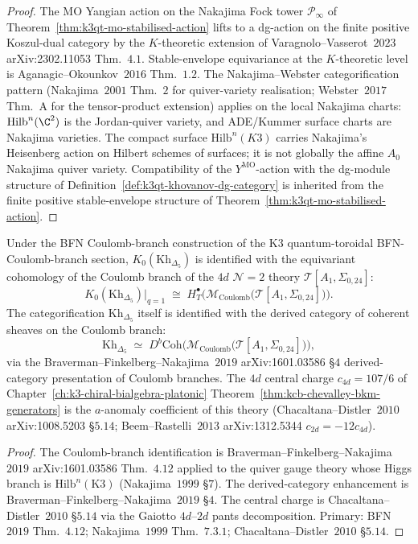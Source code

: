 \begin{proof}
The MO Yangian action on the Nakajima Fock tower $\mathcal P_\infty$
of Theorem~\ref{thm:k3qt-mo-stabilised-action} lifts to a dg-action
on the finite positive Koszul-dual category by the $K$-theoretic extension of
Varagnolo--Vasserot~$2023$ arXiv:2302.11053 Thm.\ $4.1$.
Stable-envelope equivariance at the $K$-theoretic level is
Aganagic--Okounkov~$2016$ Thm.\ $1.2$. The Nakajima--Webster
categorification pattern (Nakajima~$2001$ Thm.\ $2$ for
quiver-variety realisation; Webster~$2017$ Thm.\ A for the
tensor-product extension) applies on the local Nakajima charts:
\(\mathrm{Hilb}^n(\C^2)\) is the Jordan-quiver variety, and ADE/Kummer
surface charts are Nakajima varieties.  The compact surface
\(\mathrm{Hilb}^n(K3)\) carries Nakajima's Heisenberg action on Hilbert
schemes of surfaces; it is not globally the affine \(A_0\) Nakajima
quiver variety.
Compatibility of the $Y^{\mathrm{MO}}$-action with the dg-module
structure of Definition~\ref{def:k3qt-khovanov-dg-category} is
inherited from the finite positive stable-envelope structure of
Theorem~\ref{thm:k3qt-mo-stabilised-action}.
\end{proof}

\begin{corollary}
\label{cor:k3qt-khovanov-coulomb}
Under the BFN Coulomb-branch construction of
the K3 quantum-toroidal BFN-Coulomb-branch section, $K_0(\mathrm{Kh}_{\Delta_5})$
is identified with the equivariant cohomology of the Coulomb branch
of the $4d$ $\mathcal N = 2$ theory $\mathcal T[A_1, \Sigma_{0, 24}]$:
\[
 K_0(\mathrm{Kh}_{\Delta_5})\bigl|_{q = 1}
 \;\cong\;
 H^\bullet_T\bigl(\mathcal M_{\mathrm{Coulomb}}
 \bigl(\mathcal T[A_1, \Sigma_{0, 24}]\bigr)\bigr).
\]
The categorification $\mathrm{Kh}_{\Delta_5}$ itself is identified
with the derived category of coherent sheaves on the Coulomb branch:
\[
 \mathrm{Kh}_{\Delta_5}
 \;\simeq\;
 D^b\mathrm{Coh}\bigl(\mathcal M_{\mathrm{Coulomb}}
 \bigl(\mathcal T[A_1, \Sigma_{0, 24}]\bigr)\bigr),
\]
via the Braverman--Finkelberg--Nakajima~$2019$ arXiv:1601.03586
\S $4$ derived-category presentation of Coulomb branches. The
$4d$ central charge $c_{4d} = 107/6$ of
Chapter~\ref{ch:k3-chiral-bialgebra-platonic}
Theorem~\ref{thm:kcb-chevalley-bkm-generators} is the
$a$-anomaly coefficient of this theory
(Chacaltana--Distler~$2010$ arXiv:1008.5203 \S $5.14$;
Beem--Rastelli~$2013$ arXiv:1312.5344 $c_{2d} = -12 c_{4d}$).
\end{corollary}

\begin{proof}
The Coulomb-branch identification is Braverman--Finkelberg--Nakajima~$2019$
arXiv:1601.03586 Thm.\ $4.12$ applied to the quiver gauge theory
whose Higgs branch is $\mathrm{Hilb}^n(\mathrm{K3})$
(Nakajima~$1999$ \S $7$). The derived-category enhancement is
Braverman--Finkelberg--Nakajima~$2019$ \S $4$. The central charge
is Chacaltana--Distler~$2010$ \S $5.14$ via the Gaiotto
$4d$--$2d$ pants decomposition. Primary: BFN~$2019$ Thm.\ $4.12$;
Nakajima~$1999$ Thm.\ $7.3.1$; Chacaltana--Distler~$2010$ \S $5.14$.
\end{proof}

